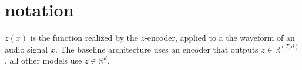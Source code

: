 \section{notation}
$z(x)$ is the function realized by the $z$-encoder, applied to a the waveform of an audio signal $x$.
The baseline architecture uses an encoder that outputs $z \in \mathbb{R}^{(T, d)}$, all other models use $z \in \mathbb{R}^d$.
